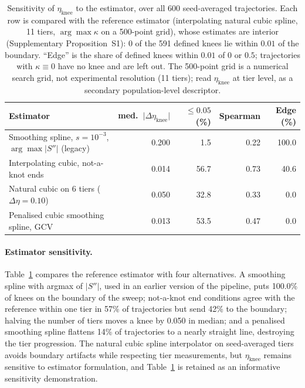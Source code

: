 \documentclass[pdflatex,sn-mathphys]{sn-jnl}
\theoremstyle{thmstyleone}
\theoremstyle{thmstyletwo}
\theoremstyle{thmstylethree}
\newcommand{\etaknee}{\eta_{\mathrm{knee}}}
\begin{document}
\begin{table}[t]
\centering
\small
\caption{Sensitivity of $\eta_{\mathrm{knee}}$ to the estimator, over all 600 seed-averaged trajectories. Each row is compared with the reference estimator (interpolating natural cubic spline, 11 tiers, $\arg\max\kappa$ on a 500-point grid), whose estimates are interior (Supplementary Proposition~S1): 0 of the 591 defined knees lie within $0.01$ of the boundary. ``Edge'' is the share of defined knees within $0.01$ of $0$ or $0.5$; trajectories with $\kappa\equiv0$ have no knee and are left out. The 500-point grid is a numerical search grid, not experimental resolution (11 tiers); read $\eta_{\mathrm{knee}}$ at tier level, as a secondary population-level descriptor.}
\label{tab:ablation}
\begin{tabular}{@{}p{4.3cm}rrrr@{}}
\toprule
Estimator & med.\ $\lvert\Delta\eta_{\mathrm{knee}}\rvert$ & $\le 0.05$ (\%) & Spearman & Edge (\%) \\
\midrule
Smoothing spline, $s=10^{-3}$, $\arg\max\lvert S''\rvert$ (legacy) & 0.200 & 1.5 & 0.22 & 100.0 \\
Interpolating cubic, not-a-knot ends & 0.014 & 56.7 & 0.73 & 40.6 \\
Natural cubic on 6 tiers ($\Delta\eta=0.10$) & 0.050 & 32.8 & 0.33 & 0.0 \\
Penalised cubic smoothing spline, GCV & 0.013 & 53.5 & 0.47 & 0.0 \\
\bottomrule
\end{tabular}
\end{table}

\paragraph{Estimator sensitivity.} Table~\ref{tab:ablation} compares the reference estimator with four alternatives. A smoothing spline with argmax of $\lvert S''\rvert$, used in an earlier version of the pipeline, puts 100.0\% of knees on the boundary of the sweep; not-a-knot end conditions agree with the reference within one tier in 57\% of trajectories but send 42\% to the boundary; halving the number of tiers moves a knee by 0.050 in median; and a penalised smoothing spline flattens 14\% of trajectories to a nearly straight line, destroying the tier progression. The natural cubic spline interpolator on seed-averaged tiers avoids boundary artifacts while respecting tier measurements, but $\etaknee$ remains sensitive to estimator formulation, and Table~\ref{tab:ablation} is retained as an informative sensitivity demonstration.
\end{document}
